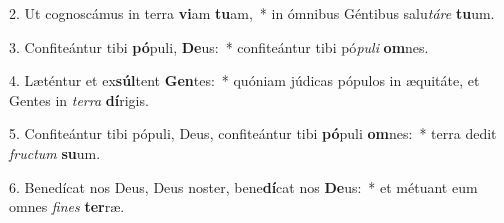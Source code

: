 2. Ut cognoscámus in terra \textbf{vi}am \textbf{tu}am,~*  in ómnibus Géntibus salu\textit{tá}\textit{re} \textbf{tu}um.\

3. Confiteántur tibi \textbf{pó}puli, \textbf{De}us:~*  confiteántur tibi pó\textit{pu}\textit{li} \textbf{om}nes.\

4. Læténtur et ex\textbf{súl}tent \textbf{Gen}tes:~*  quóniam júdicas pópulos in æquitáte, et Gentes in \textit{ter}\textit{ra} \textbf{dí}rigis.\

5. Confiteántur tibi pópuli, Deus, confiteántur tibi \textbf{pó}puli \textbf{om}nes:~*  terra dedit \textit{fruc}\textit{tum} \textbf{su}um.\

6. Benedícat nos Deus, Deus noster, bene\textbf{dí}cat nos \textbf{De}us:~*  et métuant eum omnes \textit{fi}\textit{nes} \textbf{ter}ræ.\

